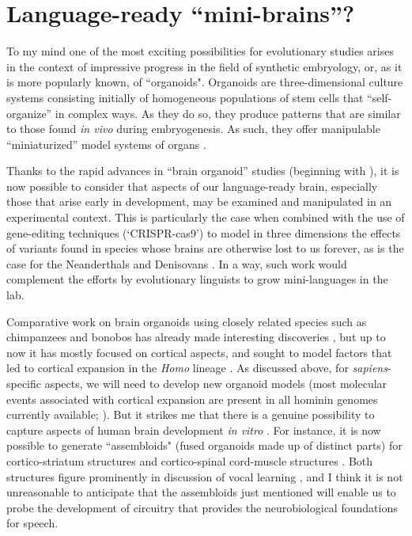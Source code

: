 \section{Language-ready ``mini-brains''?}

To my mind one of the most exciting possibilities for evolutionary studies arises in the context of impressive progress in the field of synthetic embryology, or, as it is more popularly known, of ``organoids". Organoids are three-dimensional culture systems consisting initially of homogeneous populations of stem cells that ``self-organize'' in complex ways. As they do so, they produce patterns that are similar to those found \textit{in vivo} during embryogenesis. As such, they offer manipulable ``miniaturized'' model systems of organs \citep{huch2017hope}.

\hspace*{-2pt} Thanks to the rapid advances in ``brain organoid'' studies (beginning with \cite{lancaster2013cerebral}), it is now possible to consider that aspects of our language-ready brain, especially those that arise early in development, may be examined and manipulated in an experimental context. This is particularly the case when combined with the use of gene-editing techniques (`CRISPR-cas9') to model in three dimensions the effects of variants found in species whose brains are otherwise lost to us forever, as is the  case for the Neanderthals and Denisovans \citep{Trujilloeaax2537}. In a way, such work would complement the efforts by evolutionary linguists to grow mini-languages in the lab.

Comparative work on brain organoids using closely related species such as chimpanzees and bonobos has already made interesting discoveries \citep{mora2016differences,kanton2019organoid}, but up to now it has mostly focused on cortical aspects, and sought to model factors that led to cortical expansion in the \textit{Homo} lineage \citep{heide2018brain,pollen2019establishing}. As discussed above, for \textit{sapiens}-specific aspects, we will need to develop new organoid models (most molecular events associated with cortical expansion are present in all hominin genomes currently available; \cite{florio2018evolution}). But it strikes me that there is a genuine possibility to capture aspects of human brain development \textit{in vitro} \citep{giandomenico2017probing,muchnik2019modeling,benito2020early}. For instance, it is now possible to generate ``assembloids" (fused organoids made up of distinct parts) for cortico-striatum structures \citep{miura2020generation} and cortico-spinal cord-muscle structures \citep{andersen2020generation}. Both structures figure prominently in discussion of vocal learning \citep{jarvis2019evolution}, and I think it is not unreasonable to anticipate that the assembloids just mentioned will enable us to probe the development of circuitry that provides the neurobiological foundations for speech. 

